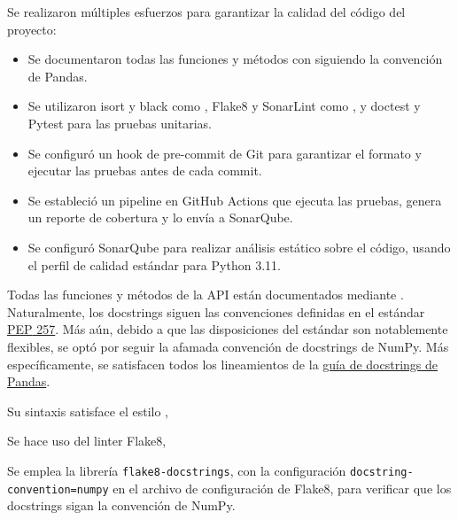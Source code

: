 \begin{resumen}
	Se realizaron múltiples esfuerzos para garantizar la calidad del código del proyecto:
	\begin{itemize}
		\item Se documentaron todas las funciones y métodos con  siguiendo la convención de \gls{Pandas}.
		\item Se utilizaron \gls{isort} y \gls{black} como , \gls{Flake8} y \gls{SonarLint} como , y \gls{doctest} y \gls{Pytest} para las \gls{pruebas unitarias}.
		\item Se configuró un \gls{hook} de pre-commit de \gls{Git} para garantizar el formato y ejecutar las pruebas antes de cada commit.
		\item Se estableció un \gls{pipeline} en \gls{GitHub Actions} que ejecuta las pruebas, genera un reporte de cobertura y lo envía a \gls{SonarQube}.
		\item Se configuró \gls{SonarQube} para realizar análisis estático sobre el código, usando el \gls{perfil de calidad} estándar para \gls{Python} 3.11.
	\end{itemize}
\end{resumen}


Todas las funciones y métodos de la \gls{API} están documentados mediante . Naturalmente, los docstrings siguen las convenciones definidas en el estándar \href{https://peps.python.org/pep-0257/}{\gls{PEP} 257}. Más aún, debido a que las disposiciones del estándar son notablemente flexibles, se optó por seguir la afamada convención de docstrings de \gls{NumPy}. Más específicamente, se satisfacen todos los lineamientos de la \href{https://python-sprints.github.io/pandas/guide/pandas_docstring.html}{guía de docstrings de \gls{Pandas}}.



Su sintaxis satisface el estilo ,



Se hace uso del linter \gls{Flake8},

Se emplea la librería \verb|flake8-docstrings|, con la configuración \verb|docstring-convention=numpy| en el archivo de configuración de Flake8, para verificar que los docstrings sigan la convención de NumPy.



